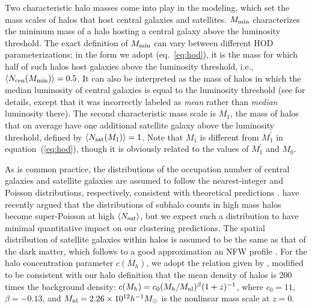 \documentclass[]{emulateapj}
\def\Mmin{M_{\rm min}}
\def\hMsun{h^{-1}M_\odot}
\begin{document}
Two characteristic halo masses come into play in the modeling, which set
the mass scales of halos that host central galaxies and satellites.  
$\Mmin$ characterizes the minimum mass of a halo hosting a central
galaxy above the luminosity threshold. The exact definition of 
$\Mmin$ can vary between different HOD parameterizations; in the 
form we adopt (eq.~\ref{eq:hod}), it is the mass for which half of such 
halos host galaxies above the luminosity threshold, i.e.,  
$\langle N_{\rm cen}(M_{\rm min}) \rangle = 0.5$. It can also be interpreted 
as the mass of halos in which the median luminosity of central 
galaxies is equal to the luminosity threshold (see \citealt{zheng07} for 
details, except that it was incorrectly labeled as {\it mean} rather than 
{\it median} luminosity there). The second characteristic mass scale is 
$M_1$, the mass of halos that on average have one additional satellite 
galaxy above the luminosity threshold, defined by
$\langle N_{\rm sat}(M_1) \rangle = 1$.  Note that $M_1$ is different from
$M_1^\prime$ in equation~(\ref{eq:hod}), though it is
obviously related to the values
of $M_1^\prime$ and $M_0$. 

As is common practice, the distributions of the occupation number of 
central galaxies and satellite galaxies are assumed to follow the 
nearest-integer and Poisson distributions, respectively, consistent with 
theoretical predictions \citep{kravtsov04,zheng05}.
\cite{boylan-kolchin09} have recently argued that the distributions of
subhalo counts in high mass halos become super-Poisson at high 
$\langle N_{\rm sat}\rangle$, but we expect such a distribution
to have minimal quantitative impact on our clustering predictions.
The spatial distribution of satellite
galaxies within halos is assumed to be the
same as that of the dark matter, which follows to a good approximation an 
NFW profile \citep{NFW96}.
For the halo concentration parameter $c(M_h)$, we adopt the relation given by 
\citet{bullock01}, modified to be consistent with our halo definition that 
the mean density of halos is 200 times the background density:
$c(M_h)=c_0(M_h/M_{\rm nl})^\beta (1+z)^{-1}$, 
where $c_0=11$, $\beta=-0.13$, and 
$M_{\rm nl} = 2.26\times 10^{12}\hMsun$ is the nonlinear mass scale at $z=0$.
\end{document}
